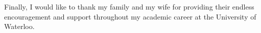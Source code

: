 Finally, I would like to thank my family and my wife for providing their endless encouragement and support throughout my academic career at the University of Waterloo. 

\cleardoublepage





\renewcommand\contentsname{Table of Contents}
\tableofcontents
\cleardoublepage
{}


\listoftables
\cleardoublepage
{}		%


\listoffigures
\cleardoublepage
{}		%




